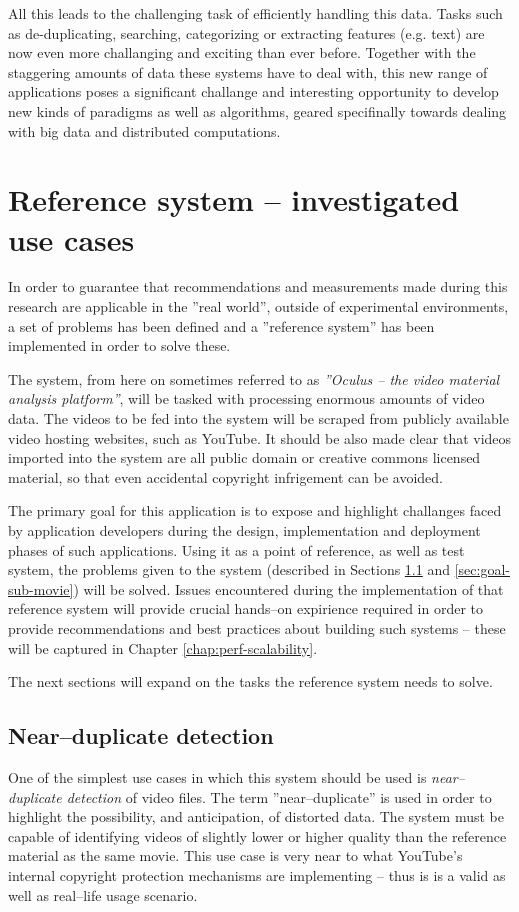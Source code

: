 All this leads to the challenging task of efficiently handling this data. Tasks such as de-duplicating, searching, categorizing or extracting features (e.g. text) are now even more challanging and exciting than ever before. Together with the staggering amounts of data these systems have to deal with, this new range of applications poses a significant challange and interesting opportunity to develop new kinds of paradigms as well as algorithms, geared specifinally towards dealing with big data and distributed computations.


\section{Reference system -- investigated use cases}
\label{sec:ref-system}

In order to guarantee that recommendations and measurements made during this research are applicable in the ''real world'', outside of experimental environments, a set of problems has been defined and a ''reference system'' has been implemented in order to solve these.

The system, from here on sometimes referred to as \textit{''Oculus -- the video material analysis platform''}, will be tasked with processing enormous amounts of video data. The videos to be fed into the system will be scraped from publicly available video hosting websites, such as YouTube. It should be also made clear that videos imported into the system are all public domain or creative commons licensed material, so that even accidental copyright infrigement can be avoided.

The primary goal for this application is to expose and highlight challanges faced by application developers during the design, implementation and deployment phases of such applications. Using it as a point of reference, as well as test system, the problems given to the system (described in Sections \ref{sec:goal-near-dup} and \ref{sec:goal-sub-movie}) will be solved. Issues encountered during the implementation of that reference system will provide crucial hands--on expirience required in order to provide recommendations and best practices about building such systems -- these will be captured in Chapter \ref{chap:perf-scalability}.

The next sections will expand on the tasks the reference system needs to solve.


\subsection{Near--duplicate detection}
\label{sec:goal-near-dup}
One of the simplest use cases in which this system should be used is \textit{near--duplicate detection} of video files. The term ''near--duplicate'' is used in order to highlight the possibility, and anticipation, of distorted data. The system must be capable of identifying videos of slightly lower or higher quality than the reference material as the same movie. This use case is very near to what YouTube's \cite{youtube} internal copyright protection mechanisms are implementing -- thus is is a valid as well as real--life usage scenario.

